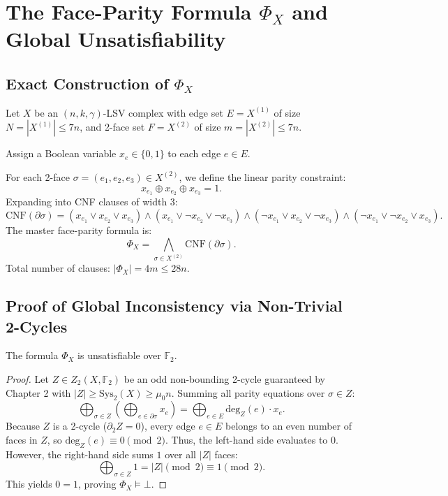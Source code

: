 \chapter{The Face-Parity Formula $\Phi_X$ and Global Unsatisfiability}

\section{Exact Construction of $\Phi_X$}
Let $X$ be an $(n, k, \gamma)$-LSV complex with edge set $E = X^{(1)}$ of size $N = |X^{(1)}| \le 7n$, and 2-face set $F = X^{(2)}$ of size $m = |X^{(2)}| \le 7n$.

Assign a Boolean variable $x_e \in \{0, 1\}$ to each edge $e \in E$.

\begin{definition}
For each 2-face $\sigma = (e_1, e_2, e_3) \in X^{(2)}$, we define the linear parity constraint:
\[
x_{e_1} \oplus x_{e_2} \oplus x_{e_3} = 1.
\]
Expanding into CNF clauses of width 3:
\[
\mathrm{CNF}(\partial \sigma) = (x_{e_1} \lor x_{e_2} \lor x_{e_3}) \land (x_{e_1} \lor \neg x_{e_2} \lor \neg x_{e_3}) \land (\neg x_{e_1} \lor x_{e_2} \lor \neg x_{e_3}) \land (\neg x_{e_1} \lor \neg x_{e_2} \lor x_{e_3}).
\]
The master face-parity formula is:
\[
\Phi_X = \bigwedge_{\sigma \in X^{(2)}} \mathrm{CNF}(\partial \sigma).
\]
Total number of clauses: $|\Phi_X| = 4m \le 28n$.
\end{definition}

\section{Proof of Global Inconsistency via Non-Trivial 2-Cycles}
\begin{theorem}
The formula $\Phi_X$ is unsatisfiable over $\mathbb{F}_2$.
\end{theorem}

\begin{proof}
Let $Z \in Z_2(X, \mathbb{F}_2)$ be an odd non-bounding 2-cycle guaranteed by Chapter 2 with $|Z| \ge \mathrm{Sys}_2(X) \ge \mu_0 n$.
Summing all parity equations over $\sigma \in Z$:
\[
\bigoplus_{\sigma \in Z} \left( \bigoplus_{e \in \partial \sigma} x_e \right) = \bigoplus_{e \in E} \mathrm{deg}_Z(e) \cdot x_e.
\]
Because $Z$ is a 2-cycle ($\partial_2 Z = 0$), every edge $e \in E$ belongs to an even number of faces in $Z$, so $\mathrm{deg}_Z(e) \equiv 0 \pmod 2$. 
Thus, the left-hand side evaluates to $0$.
However, the right-hand side sums $1$ over all $|Z|$ faces:
\[
\bigoplus_{\sigma \in Z} 1 = |Z| \pmod 2 \equiv 1 \pmod 2.
\]
This yields $0 = 1$, proving $\Phi_X \models \bot$.
\end{proof}
